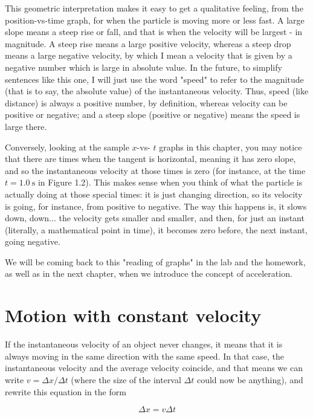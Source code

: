 \documentclass[10pt]{article}
\begin{document}
This geometric interpretation makes it easy to get a qualitative feeling, from the position-vs-time graph, for when the particle is moving more or less fast. A large slope means a steep rise or fall, and that is when the velocity will be largest - in magnitude. A steep rise means a large positive velocity, whereas a steep drop means a large negative velocity, by which I mean a velocity that is given by a negative number which is large in absolute value. In the future, to simplify sentences like this one, I will just use the word "speed" to refer to the magnitude (that is to say, the absolute value) of the instantaneous velocity. Thus, speed (like distance) is always a positive number, by definition, whereas velocity can be positive or negative; and a steep slope (positive or negative) means the speed is large there.

Conversely, looking at the sample $x$-vs- $t$ graphs in this chapter, you may notice that there are times when the tangent is horizontal, meaning it has zero slope, and so the instantaneous velocity at those times is zero (for instance, at the time $t=1.0 \mathrm{~s}$ in Figure 1.2). This makes sense when you think of what the particle is actually doing at those special times: it is just changing direction, so its velocity is going, for instance, from positive to negative. The way this happens is, it slows down, down... the velocity gets smaller and smaller, and then, for just an instant (literally, a mathematical point in time), it becomes zero before, the next instant, going negative.

We will be coming back to this "reading of graphs" in the lab and the homework, as well as in the next chapter, when we introduce the concept of acceleration.

\section*{Motion with constant velocity}
If the instantaneous velocity of an object never changes, it means that it is always moving in the same direction with the same speed. In that case, the instantaneous velocity and the average velocity coincide, and that means we can write $v=\Delta x / \Delta t$ (where the size of the interval $\Delta t$ could now be anything), and rewrite this equation in the form


\begin{equation*}
\Delta x=v \Delta t \tag{1.9}
\end{equation*}
\end{document}
